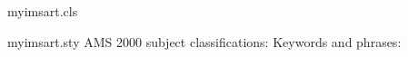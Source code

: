 \begin{filecontents*}{myimsart.cls}
\RequirePackage{myimsart}
\end{filecontents*}
\begin{filecontents*}{myimsart.sty}
\def\sep@key@value#1=#2/?/#3{\setpkgattr{#3}{#1}{#2}}
\def\do@option@list#1#2{\@for\curr@option:={#2}\do{\expandafter\sep@key@value\curr@option/?/{#1}\relax}}
\protected\def\setpkgattr#1#2#3{\expandafter\long\expandafter\gdef\csname #1@#2\endcsname{#3}}
\def\ims@href#1#2{#2}
\def\msc@url{https://mathscinet.ams.org/mathscinet/msc/msc2020.html}
\newtoks\keywords@list
\def\addto@keywords@list#1{\keywords@list=\expandafter{\the\keywords@list#1, }}
\newbox\keyword@box
\setpkgattr{keyword}{AMS}{AMS 2000 subject classifications:}
\setpkgattr{keyword}{KWD}{Keywords and phrases:}
\gdef\keyword{\@ifnextchar[{\@keyword}{\@keyword[class=KWD]}}
\gdef\@keyword[#1]{\do@option@list{keyword}{#1}\def\keyword@name{\csname keyword@\keyword@class\endcsname}%
  \let\kwd@sep\relax
  \global\setbox\keyword@box=\vbox\bgroup\ifvoid\keyword@box\else\unvbox\keyword@box\fi
  \noindent{\keyword@name}\space\hskip.1pt}
\def\endkeyword{\unskip.\par\egroup}
\def\keyword@fmt{\ifvoid\keyword@box\else\unvbox\keyword@box\fi}
\def\sep{\unskip\string, }
\DeclareRobustCommand*\kwd{\@ifnextchar[\@kwd{\@kwd[\kwd@sep]}}
\def\@kwd[#1]#2{\unskip#1{#2}\addto@keywords@list{#2}\let\kwd@sep\sep}
\newenvironment{frontmatter}{}{\maketitle}
\def\maketitle{\keyword@fmt}
\end{filecontents*}
